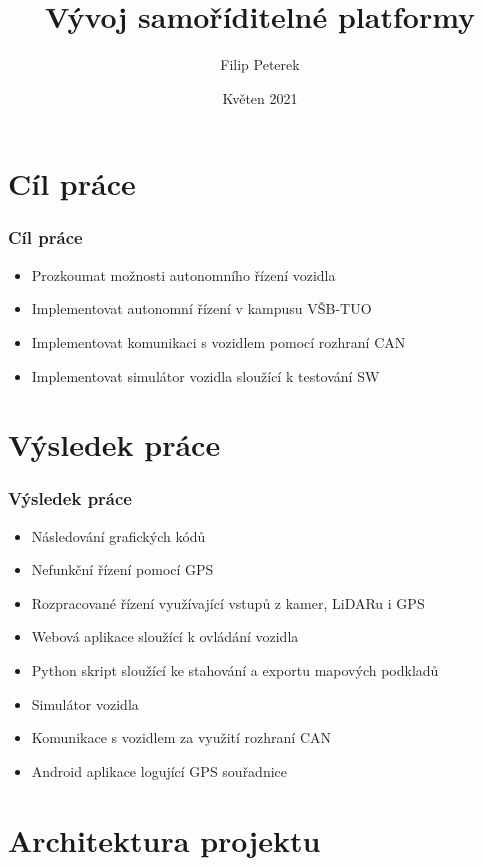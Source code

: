\documentclass{beamer}
\title{Vývoj samoříditelné platformy}
\author{Filip Peterek}
\institute{Vysoká škola Báňská - Technická univerzita Ostrava}
\date{Květen 2021}
\begin{document}
\frame{\titlepage}

\section{Cíl práce}
\begin{frame}
    \frametitle{Cíl práce}

    \begin{itemize}
        \item Prozkoumat možnosti autonomního řízení vozidla
        \item Implementovat autonomní řízení v kampusu VŠB-TUO
        \item Implementovat komunikaci s vozidlem pomocí rozhraní CAN
        \item Implementovat simulátor vozidla sloužící k testování SW
    \end{itemize}

\end{frame}

\section{Výsledek práce}
\begin{frame}
    \frametitle{Výsledek práce}
    
    \begin{itemize}
        \item Následování grafických kódů
        \item Nefunkční řízení pomocí GPS
        \item Rozpracované řízení využívající vstupů z kamer, LiDARu i GPS
        \item Webová aplikace sloužící k ovládání vozidla
        \item Python skript sloužící ke stahování a exportu mapových podkladů
        \item Simulátor vozidla
        \item Komunikace s vozidlem za využití rozhraní CAN
        \item Android aplikace logující GPS souřadnice
    \end{itemize}
\end{frame}

\section{Architektura projektu}
\end{document}
